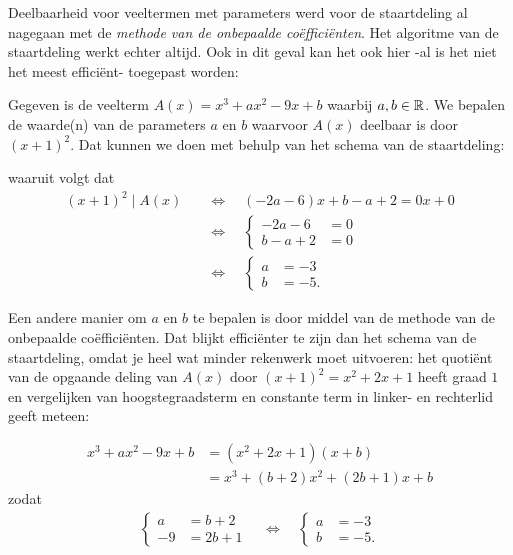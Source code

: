 \documentclass{ximera}
\begin{document}
Deelbaarheid voor veeltermen met parameters werd voor de staartdeling al nagegaan met de \textit{methode van de onbepaalde coëfficiënten}. Het algoritme van de staartdeling werkt echter altijd. Ook in dit geval kan het ook hier -al is het niet het meest efficiënt-  toegepast worden: 

\begin{example} 
Gegeven is de veelterm $A(x) = x^3 + ax^2 - 9x + b$ waarbij $a,b \in \mathbb{R}$. We bepalen de waarde(n) van de parameters $a$ en $b$ waarvoor $A(x)$ deelbaar is door $(x+1)^2$. Dat kunnen we doen met behulp van het schema van de staartdeling:

waaruit volgt dat  
\begin{align*}
(x+1)^2 \mid A(x) \quad 
& \Leftrightarrow \quad (-2a-6)x+b-a+2 = 0x + 0 \\
& \Leftrightarrow \quad
\left\{ 
\begin{aligned}
-2a-6 & = 0 \\
b-a+2 & = 0 
\end{aligned}
\right. \\ 
& \Leftrightarrow \quad
\left\{ 
\begin{aligned}
a & = -3 \\
b & = -5. 
\end{aligned}
\right.
\end{align*} 

Een andere manier om $a$ en $b$ te bepalen is door middel van de methode van de onbepaalde coëfficiënten. Dat blijkt efficiënter te zijn dan het schema van de staartdeling, omdat je heel wat minder rekenwerk moet uitvoeren: het quotiënt van de opgaande deling van $A(x)$ door $(x+1)^2 = x^2 + 2x + 1$ heeft graad $1$ en vergelijken van hoogstegraadsterm en constante term in linker- en rechterlid geeft meteen:

\begin{align*}
x^3 + ax^2 - 9x + b 
& = (x^2 + 2x + 1)(x + b) \\
& = x^3 + (b+2)x^2 + (2b+1)x + b
\end{align*}
zodat 
\begin{align*}
\left\{ 
\begin{aligned}
a & = b+2 \\
-9 & = 2b+1
\end{aligned}
\right. 
\quad \Leftrightarrow \quad
\left\{ 
\begin{aligned}
a & = -3 \\
b & = -5. 
\end{aligned}
\right.
\end{align*}
\end{example} 
	
\end{document}
